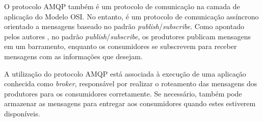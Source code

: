 O protocolo AMQP também é um protocolo de comunicação na camada de aplicação do Modelo OSI. No entanto, é um protocolo de comunicação assíncrono orientado a mensagens baseado no padrão \textit{publish}/\textit{subscribe}. Como apontado pelos autores , no padrão \textit{publish}/\textit{subscribe}, os produtores publicam mensagens em um barramento, enquanto os consumidores se subscrevem para receber mensagens com as informações que desejam. 


A utilização do protocolo AMQP está associada à execução de uma aplicação conhecida como \textit{broker}, responsável por realizar o roteamento das mensagens dos produtores para os consumidores corretamente. Se necessário, também pode armazenar as mensagens para entregar aos consumidores quando estes estiverem disponíveis.




